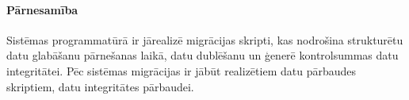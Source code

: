 \paragraph{Pārnesamība}

Sistēmas programmatūrā ir jārealizē migrācijas skripti, kas nodrošina
strukturētu datu glabāšanu pārnešanas laikā, datu dublēšanu un ģenerē
kontrolsummas datu integritātei. Pēc sistēmas migrācijas ir jābūt realizētiem
datu pārbaudes skriptiem, datu integritātes pārbaudei.
